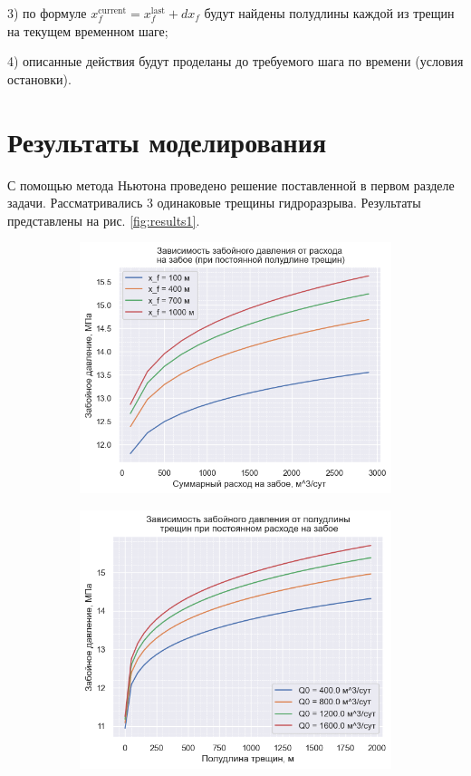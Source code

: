 3) по формуле $x_{\!f}^{\text{current}}=x_{\!f}^{\text{last}}+dx_{\!f}$ будут найдены полудлины каждой из трещин на текущем временном шаге;

4) описанные действия будут проделаны до требуемого шага по времени (условия остановки).

\section{Результаты моделирования}

С помощью метода Ньютона проведено решение поставленной в первом разделе задачи.
Рассматривались 3 одинаковые трещины гидроразрыва.
Результаты представлены на рис. \ref{fig:results1}.

\begin{figure}[H]
	\begin{subfigure}[t]{\dimexpr.5\linewidth-1.3em\relax}
		\centering
		\includegraphics[width=.95\linewidth,valign=t]{images/p_0(q_0).png}
	\end{subfigure}
\hfill %
	\begin{subfigure}[t]{\dimexpr.5\linewidth-1.3em\relax}
		\centering
		\includegraphics[width=.95\linewidth,valign=t]{images/p_0(x_f).png}

\end{subfigure}
\end{figure}
